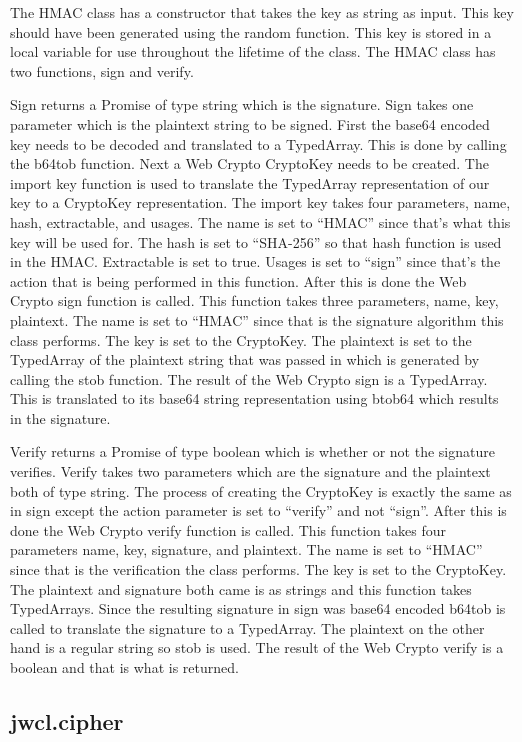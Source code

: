 The HMAC class has a constructor that takes the key as string as input. This key should have been generated using the random function. This key is stored in a local variable for use throughout the lifetime of the class. The HMAC class has two functions, sign and verify.


Sign returns a Promise of type string which is the signature. Sign takes one parameter which is the plaintext string to be signed. First the base64 encoded key needs to be decoded and translated to a TypedArray. This is done by calling the b64tob function. Next a Web Crypto CryptoKey needs to be created. The import key function is used to translate the TypedArray representation of our key to a CryptoKey representation. The import key takes four parameters, name, hash, extractable, and usages. The name is set to “HMAC” since that's what this key will be used for. The hash is set to “SHA-256” so that hash function is used in the HMAC. Extractable is set to true. Usages is set to “sign” since that's the action that is being performed in this function. After this is done the Web Crypto sign function is called. This function takes three parameters, name, key, plaintext. The name is set to “HMAC” since that is the signature algorithm this class performs. The key is set to the CryptoKey. The plaintext is set to the TypedArray of the plaintext string that was passed in which is generated by calling the stob function. The result of the Web Crypto sign is a TypedArray. This is translated to its base64 string representation using btob64 which results in the signature.

Verify returns a Promise of type boolean which is whether or not the signature verifies. Verify takes two parameters which are the signature and the plaintext both of type string. The process of creating the CryptoKey is exactly the same as in sign except the action parameter is set to “verify” and not “sign”. After this is done the Web Crypto verify function is called. This function takes four parameters name, key, signature, and plaintext. The name is set to “HMAC” since that is the verification the class performs. The key is set to the CryptoKey. The plaintext and signature both came is as strings and this function takes TypedArrays. Since the resulting signature in sign was base64 encoded b64tob is called to translate the signature to a TypedArray. The plaintext on the other hand is a regular string so stob is used. The result of the Web Crypto verify is a boolean and that is what is returned.


\subsection{jwcl.cipher}


